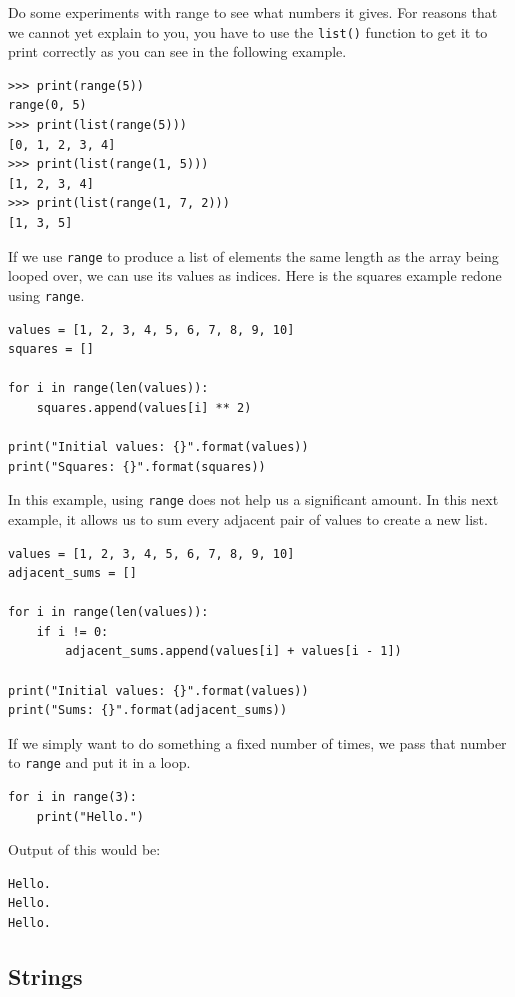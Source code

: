 \documentclass[11pt]{cselabheader}
\begin{document}
Do some experiments with range to see what numbers it gives. For reasons that we
cannot yet explain to you, you have to use the \lstinline!list()! function to
get it to print correctly as you can see in the following example.
\begin{lstlisting}[style=ipython]
>>> print(range(5))
range(0, 5)
>>> print(list(range(5)))
[0, 1, 2, 3, 4]
>>> print(list(range(1, 5)))
[1, 2, 3, 4]
>>> print(list(range(1, 7, 2)))
[1, 3, 5]
\end{lstlisting}

If we use \lstinline{range} to produce a list of elements the same length as the
array being looped over, we can use its values as indices. Here is the squares
example redone using \lstinline{range}.

\begin{lstlisting}[style=python]
values = [1, 2, 3, 4, 5, 6, 7, 8, 9, 10]
squares = []

for i in range(len(values)):
    squares.append(values[i] ** 2)

print("Initial values: {}".format(values))
print("Squares: {}".format(squares))
\end{lstlisting}

In this example, using \lstinline{range} does not help us a significant amount.
In this next example, it allows us to sum every adjacent pair of values to
create a new list.

\begin{lstlisting}[style=python]
values = [1, 2, 3, 4, 5, 6, 7, 8, 9, 10]
adjacent_sums = []

for i in range(len(values)):
    if i != 0:
        adjacent_sums.append(values[i] + values[i - 1])

print("Initial values: {}".format(values))
print("Sums: {}".format(adjacent_sums))
\end{lstlisting}

If we simply want to do something a fixed number of times, we pass that number
to \lstinline{range} and put it in a loop.

\begin{lstlisting}[style=python]
for i in range(3):
    print("Hello.")
\end{lstlisting}

Output of this would be:
\begin{lstlisting}[style=bash]
Hello.
Hello.
Hello.
\end{lstlisting}

\subsection{Strings}
\end{document}
